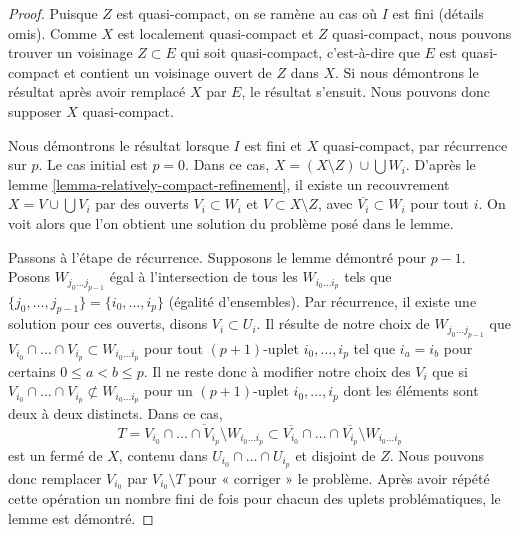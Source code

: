 \begin{proof}
Puisque $Z$ est quasi-compact, on se ramène au cas où $I$ est fini (détails
omis). Comme $X$ est localement quasi-compact et $Z$ quasi-compact, nous
pouvons trouver un voisinage $Z \subset E$ qui soit quasi-compact,
c'est-à-dire que $E$ est quasi-compact et contient un voisinage ouvert de
$Z$ dans $X$. Si nous démontrons le résultat après avoir remplacé $X$ par
$E$, le résultat s'ensuit. Nous pouvons donc supposer $X$ quasi-compact.

\medskip\noindent
Nous démontrons le résultat lorsque $I$ est fini et $X$ quasi-compact, par
récurrence sur $p$. Le cas initial est $p = 0$. Dans ce cas,
$X = (X \setminus Z) \cup \bigcup W_i$. D'après le
lemme \ref{lemma-relatively-compact-refinement}, il existe un recouvrement
$X = V \cup \bigcup V_i$ par des ouverts $V_i \subset W_i$ et
$V \subset X \setminus Z$, avec $\overline{V_i} \subset W_i$ pour tout $i$.
On voit alors que l'on obtient une solution du problème posé dans le lemme.

\medskip\noindent
Passons à l'étape de récurrence. Supposons le lemme démontré pour $p - 1$.
Posons $W_{j_0 \ldots j_{p - 1}}$ égal à l'intersection de tous les
$W_{i_0 \ldots i_p}$ tels que
$\{j_0, \ldots, j_{p - 1}\} = \{i_0, \ldots, i_p\}$ (égalité d'ensembles).
Par récurrence, il existe une solution pour ces ouverts, disons
$V_i \subset U_i$.
Il résulte de notre choix de $W_{j_0 \ldots j_{p - 1}}$ que
$V_{i_0} \cap \ldots \cap V_{i_p} \subset W_{i_0 \ldots i_p}$
pour tout $(p + 1)$-uplet $i_0, \ldots, i_p$ tel que $i_a = i_b$ pour
certains $0 \leq a < b \leq p$.
Il ne reste donc à modifier notre choix des $V_i$ que si
$V_{i_0} \cap \ldots \cap V_{i_p} \not \subset W_{i_0 \ldots i_p}$
pour un $(p + 1)$-uplet $i_0, \ldots, i_p$ dont les éléments sont deux à
deux distincts. Dans ce cas,
$$
T =
\overline{V_{i_0} \cap \ldots \cap V_{i_p} \setminus W_{i_0 \ldots i_p}}
\subset 
\overline{V_{i_0}} \cap \ldots \cap \overline{V_{i_p}} \setminus
W_{i_0 \ldots i_p}
$$
est un fermé de $X$, contenu dans $U_{i_0} \cap \ldots \cap U_{i_p}$ et
disjoint de $Z$. Nous pouvons donc remplacer $V_{i_0}$ par
$V_{i_0} \setminus T$ pour « corriger » le problème. Après avoir répété cette
opération un nombre fini de fois pour chacun des uplets problématiques, le
lemme est démontré.
\end{proof}

